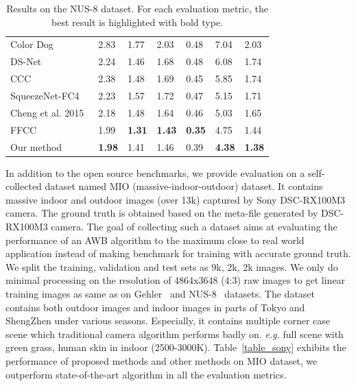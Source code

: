 \documentclass[10pt,twocolumn,letterpaper]{article}
\begin{document}
\begin{table}[tb]
{\begin{tabular}{l|llllll}
Color Dog~\cite{banic2015color}& 2.83 & 1.77 & 2.03 & 0.48 & 7.04 & 2.03 \\
DS-Net~\cite{shi2016deep}& 2.24 & 1.46 & 1.68 & 0.48 & 6.08 & 1.74\\
CCC~\cite{barron2015convolutional}& 2.38 & 1.48 & 1.69 & 0.45 & 5.85 & 1.74 \\
SqueezeNet-FC4~\cite{hu2017fc}& 2.23 & 1.57 & 1.72 & 0.47 & 5.15 & 1.71 \\
Cheng et al. 2015~\cite{cheng2015effective}& 2.18 & 1.48 & 1.64 & 0.46 & 5.03 & 1.65 \\
FFCC~\cite{DBLP:journals/corr/BarronT16}& 1.99 & \textbf{1.31} & \textbf{1.43} & \textbf{0.35} & 4.75 & 1.44\\
\hline
Our method & \textbf{1.98} & 1.41 & 1.46 & 0.39 & \textbf{4.38} & \textbf{1.38} \\
\hline
\end{tabular}
}
\caption{Results on the NUS-8 dataset.
For each evaluation metric, the best result is highlighted with bold type.}
\label{table_nus8}
\end{table}


In addition to the open source benchmarks, we provide evaluation on a self-collected dataset named MIO (massive-indoor-outdoor) dataset.
It contains massive indoor and outdoor images (over 13k) captured by Sony DSC-RX100M3 camera.
The ground truth is obtained based on the meta-file generated by DSC-RX100M3 camera.
The goal of collecting such a dataset aims at evaluating the performance of an AWB algorithm to
the maximum close to real world application instead of making benchmark for training with accurate ground truth.
We split the training, validation and test sets as 9k, 2k, 2k images.
We only do minimal processing on the resolution of 4864x3648 (4:3) raw images to get linear training images as same as on
Gehler~\cite{gehler2008bayesian} and NUS-8~\cite{cheng2014illuminant} datasets.
The dataset contains both outdoor images and indoor images in parts of Tokyo and ShengZhen under various seasons.
Especially, it contains multiple corner case scene which traditional camera algorithm performs badly on.
\textit{e.g.} full scene with green grass, human skin in indoor (2500-3000K).
Table~\ref{table_sony} exhibits the performance of proposed methods and other methods on MIO dataset,
we outperform state-of-the-art algorithm in all the evaluation metrics.
\end{document}
